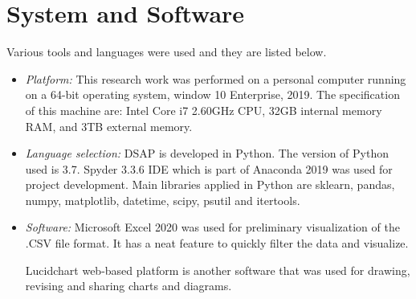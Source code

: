     






\section{System and Software}

Various tools and languages were used and they are listed below.

\begin{itemize}
    \item\textit{Platform:} This research work was performed on a personal computer running on a 64-bit operating system, window 10 Enterprise, 2019. The specification of this machine are: Intel Core i7 2.60GHz CPU, 32GB internal memory RAM, and 3TB external memory. 
    \item\textit{Language selection:} DSAP is developed in Python. The version of Python used is 3.7. Spyder 3.3.6 IDE which is part of Anaconda 2019 was used for project development. Main libraries applied in Python are sklearn, pandas, numpy, matplotlib, datetime, scipy, psutil and itertools.
    
    
    \item\textit{Software:} Microsoft Excel 2020 was used for preliminary visualization of the .CSV file format. It has a neat feature to quickly filter the data and visualize.
    
    Lucidchart web-based platform is another software that was used for drawing, revising and sharing charts and diagrams.
    

\end{itemize}


% 
